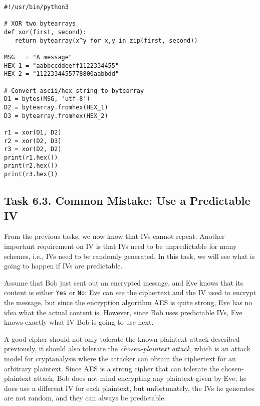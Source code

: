 \begin{lstlisting}
#!/usr/bin/python3

# XOR two bytearrays
def xor(first, second):
   return bytearray(x^y for x,y in zip(first, second))

MSG   = "A message"
HEX_1 = "aabbccddeeff1122334455"
HEX_2 = "1122334455778800aabbdd"

# Convert ascii/hex string to bytearray
D1 = bytes(MSG, 'utf-8')
D2 = bytearray.fromhex(HEX_1)
D3 = bytearray.fromhex(HEX_2)

r1 = xor(D1, D2)
r2 = xor(D2, D3)
r3 = xor(D2, D2)
print(r1.hex())
print(r2.hex())
print(r3.hex())
\end{lstlisting}

 

\subsection{Task 6.3. Common Mistake: Use a Predictable IV}

From the previous tasks, we now know that IVs cannot
repeat. Another important requirement on IV is that
IVs need to be unpredictable for many schemes, i.e., IVs need to
be randomly generated. In this task, we will see what is going to happen if
IVs are predictable.

Assume that Bob just sent out an encrypted message, and Eve knows that its
content is either \texttt{Yes} or \texttt{No};
Eve can see the ciphertext and the IV used
to encrypt the message, but since the encryption algorithm AES is quite
strong, Eve has no idea what the actual content is. However, since Bob uses
predictable IVs, Eve knows exactly what IV Bob is going to use next.




A good cipher should not only tolerate the known-plaintext attack described
previously, it should also tolerate the \textit{chosen-plaintext attack},
which is an attack model for cryptanalysis where the attacker can obtain the
ciphertext for an arbitrary plaintext. Since AES is a strong cipher that
can tolerate the chosen-plaintext attack, Bob does not mind encrypting any
plaintext given by Eve; he does use a different IV for each plaintext,
but unfortunately, the IVs he generates are not random, and they can
always be predictable.

